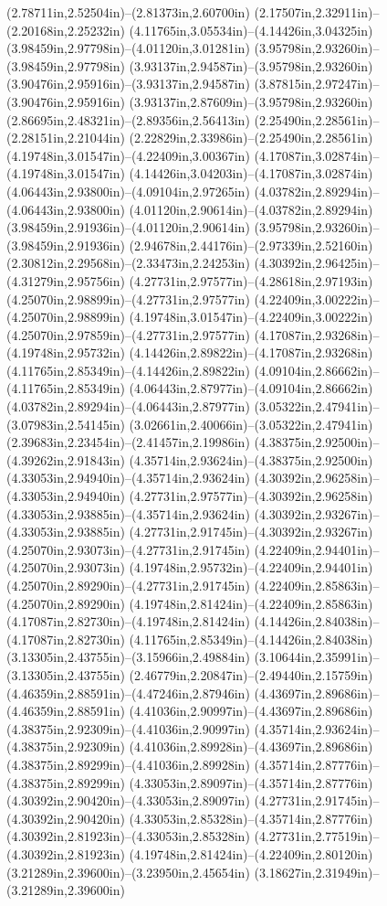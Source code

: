 (2.78711in,2.52504in)--(2.81373in,2.60700in) (2.17507in,2.32911in)--(2.20168in,2.25232in) (4.11765in,3.05534in)--(4.14426in,3.04325in) (3.98459in,2.97798in)--(4.01120in,3.01281in) (3.95798in,2.93260in)--(3.98459in,2.97798in) (3.93137in,2.94587in)--(3.95798in,2.93260in) (3.90476in,2.95916in)--(3.93137in,2.94587in) (3.87815in,2.97247in)--(3.90476in,2.95916in) (3.93137in,2.87609in)--(3.95798in,2.93260in) (2.86695in,2.48321in)--(2.89356in,2.56413in) (2.25490in,2.28561in)--(2.28151in,2.21044in) (2.22829in,2.33986in)--(2.25490in,2.28561in) (4.19748in,3.01547in)--(4.22409in,3.00367in) (4.17087in,3.02874in)--(4.19748in,3.01547in) (4.14426in,3.04203in)--(4.17087in,3.02874in) (4.06443in,2.93800in)--(4.09104in,2.97265in) (4.03782in,2.89294in)--(4.06443in,2.93800in) (4.01120in,2.90614in)--(4.03782in,2.89294in) (3.98459in,2.91936in)--(4.01120in,2.90614in) (3.95798in,2.93260in)--(3.98459in,2.91936in) (2.94678in,2.44176in)--(2.97339in,2.52160in) (2.30812in,2.29568in)--(2.33473in,2.24253in) (4.30392in,2.96425in)--(4.31279in,2.95756in) (4.27731in,2.97577in)--(4.28618in,2.97193in) (4.25070in,2.98899in)--(4.27731in,2.97577in) (4.22409in,3.00222in)--(4.25070in,2.98899in) (4.19748in,3.01547in)--(4.22409in,3.00222in) (4.25070in,2.97859in)--(4.27731in,2.97577in) (4.17087in,2.93268in)--(4.19748in,2.95732in) (4.14426in,2.89822in)--(4.17087in,2.93268in) (4.11765in,2.85349in)--(4.14426in,2.89822in) (4.09104in,2.86662in)--(4.11765in,2.85349in) (4.06443in,2.87977in)--(4.09104in,2.86662in) (4.03782in,2.89294in)--(4.06443in,2.87977in) (3.05322in,2.47941in)--(3.07983in,2.54145in) (3.02661in,2.40066in)--(3.05322in,2.47941in) (2.39683in,2.23454in)--(2.41457in,2.19986in) (4.38375in,2.92500in)--(4.39262in,2.91843in) (4.35714in,2.93624in)--(4.38375in,2.92500in) (4.33053in,2.94940in)--(4.35714in,2.93624in) (4.30392in,2.96258in)--(4.33053in,2.94940in) (4.27731in,2.97577in)--(4.30392in,2.96258in) (4.33053in,2.93885in)--(4.35714in,2.93624in) (4.30392in,2.93267in)--(4.33053in,2.93885in) (4.27731in,2.91745in)--(4.30392in,2.93267in) (4.25070in,2.93073in)--(4.27731in,2.91745in) (4.22409in,2.94401in)--(4.25070in,2.93073in) (4.19748in,2.95732in)--(4.22409in,2.94401in) (4.25070in,2.89290in)--(4.27731in,2.91745in) (4.22409in,2.85863in)--(4.25070in,2.89290in) (4.19748in,2.81424in)--(4.22409in,2.85863in) (4.17087in,2.82730in)--(4.19748in,2.81424in) (4.14426in,2.84038in)--(4.17087in,2.82730in) (4.11765in,2.85349in)--(4.14426in,2.84038in) (3.13305in,2.43755in)--(3.15966in,2.49884in) (3.10644in,2.35991in)--(3.13305in,2.43755in) (2.46779in,2.20847in)--(2.49440in,2.15759in) (4.46359in,2.88591in)--(4.47246in,2.87946in) (4.43697in,2.89686in)--(4.46359in,2.88591in) (4.41036in,2.90997in)--(4.43697in,2.89686in) (4.38375in,2.92309in)--(4.41036in,2.90997in) (4.35714in,2.93624in)--(4.38375in,2.92309in) (4.41036in,2.89928in)--(4.43697in,2.89686in) (4.38375in,2.89299in)--(4.41036in,2.89928in) (4.35714in,2.87776in)--(4.38375in,2.89299in) (4.33053in,2.89097in)--(4.35714in,2.87776in) (4.30392in,2.90420in)--(4.33053in,2.89097in) (4.27731in,2.91745in)--(4.30392in,2.90420in) (4.33053in,2.85328in)--(4.35714in,2.87776in) (4.30392in,2.81923in)--(4.33053in,2.85328in) (4.27731in,2.77519in)--(4.30392in,2.81923in) (4.19748in,2.81424in)--(4.22409in,2.80120in) (3.21289in,2.39600in)--(3.23950in,2.45654in) (3.18627in,2.31949in)--(3.21289in,2.39600in) 